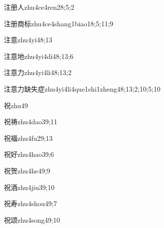 \begin{verbete}{注册人}{zhu4ce4ren2}{8;5;2}
\end{verbete}
\begin{verbete}{注册商标}{zhu4ce4shang1biao1}{8;5;11;9}
\end{verbete}
\begin{verbete}{注意}{zhu4yi4}{8;13}
\end{verbete}
\begin{verbete}{注意地}{zhu4yi4di4}{8;13;6}
\end{verbete}
\begin{verbete}{注意力}{zhu4yi4li4}{8;13;2}
\end{verbete}
\begin{verbete}{注意力缺失症}{zhu4yi4li4que1shi1zheng4}{8;13;2;10;5;10}
\end{verbete}
\begin{verbete}{祝}{zhu4}{9}
\end{verbete}
\begin{verbete}{祝祷}{zhu4dao3}{9;11}
\end{verbete}
\begin{verbete}{祝福}{zhu4fu2}{9;13}
\end{verbete}
\begin{verbete}{祝好}{zhu4hao3}{9;6}
\end{verbete}
\begin{verbete}{祝贺}{zhu4he4}{9;9}
\end{verbete}
\begin{verbete}{祝酒}{zhu4jiu3}{9;10}
\end{verbete}
\begin{verbete}{祝寿}{zhu4shou4}{9;7}
\end{verbete}
\begin{verbete}{祝颂}{zhu4song4}{9;10}
\end{verbete}
